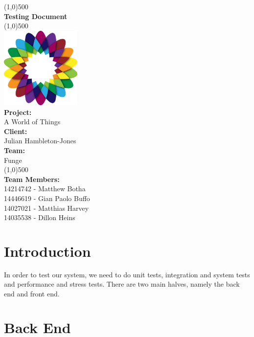 \documentclass{article}
\begin{document}
\begin{titlepage}
	\begin{center}
		\line(1,0){500}\\
		[6mm]
		\huge{\bfseries Testing Document}\\
		\line(1,0){500}\\
		[5mm]
		\includegraphics[width=150px]{../images/AWorldOfPlants.png}
		\\
		[5mm]
		\large\textbf{Project:}\\A World of Things\\
		[3mm]
		\large\textbf{Client:}\\Julian Hambleton-Jones\\
		[3mm]
		\large \textbf{Team:}\\Funge\\
		\line(1,0){500}\\
		[5mm]
		\large \textbf{Team Members:}\\
		[3mm]
		\large 14214742 - Matthew Botha\\
		\large 14446619 - Gian Paolo Buffo\\
		\large 14027021 - Matthias Harvey\\
        \large 14035538 - Dillon Heins\\[3mm]
	\end{center}
\end{titlepage}

\cleardoublepage
\thispagestyle{empty}
\tableofcontents
\cleardoublepage
\setcounter{page}{1}

\section{Introduction}
	In order to test our system, we need to do unit tests, integration and system tests and performance and stress tests. There are two main halves, namely the back end and front end.

\section{Back End}
\end{document}
